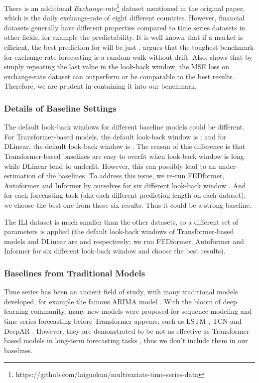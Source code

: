 \documentclass{article} \usepackage{iclr2023_conference,times}
\begin{document}
There is an additional \textit{Exchange-rate}\footnote{https://github.com/laiguokun/multivariate-time-series-data} dataset mentioned in the original paper, which is the daily exchange-rate of eight different countries. However, financial datasets generally have different properties compared to time series datasets in other fields, for example the predictability. It is well known that if a market is efficient, the best prediction for  will be just  \citep{emh}. \citet{exchange} argues that the toughest benchmark for exchange-rate forecasting is a random walk without drift. Also, \citet{dlinear} shows that by simply repeating the last value in the look-back window, the MSE loss on exchange-rate dataset can outperform or be comparable to the best results. Therefore, we are prudent in containing it into our benchmark.

\subsubsection{Details of Baseline Settings}
\label{append::baseline}

The default look-back windows for different baseline models could be different. For Transformer-based models, the default look-back window is ; and for DLinear, the default look-back window is . The reason of this difference is that Transformer-based baselines are easy to overfit when look-back window is long while DLinear tend to underfit. However, this can possibly lead to an under-estimation of the baselines. To address this issue, we re-run FEDformer, Autoformer and Informer by ourselves for six different look-back window . And for each forecasting task (aka each different prediction length on each dataset), we choose the best one from those six results. Thus it could be a strong baseline.

The ILI dataset is much smaller than the other datasets, so a different set of parameters is applied (the default look-back windows of Transformer-based models and DLinear are  and  respectively; we run FEDformer, Autoformer and Informer for six different look-back window  and choose the best results). 

\subsubsection{Baselines from Traditional Models}

Time series has been an ancient field of study, with many traditional models developed, for example the famous ARIMA model \citep{arima}. With the bloom of deep learning community, many new models were proposed for sequence modeling and time series forecasting before Transformer appears, such as LSTM \citep{lstm}, TCN \citep{tcn} and DeepAR \citep{deepar}. However, they are demonstrated to be not as effective as Transformer-based models in long-term forecasting tasks \citep{informer,autoformer}, thus we don't include them in our baselines.
\end{document}
